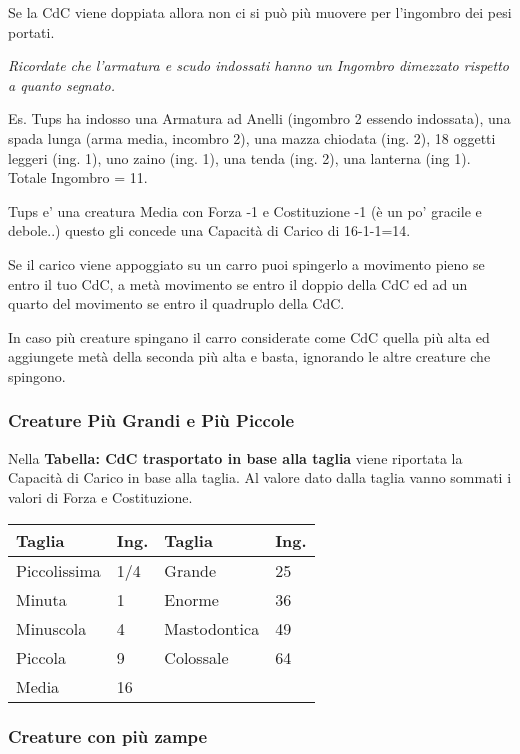 \documentclass[12pt,a4paper,twoside,openany]{book}
\begin{document}
\begin{multicols}{2}
Se la CdC viene doppiata allora non ci si può più muovere per l'ingombro dei pesi portati.

\textit{Ricordate che l'armatura e scudo indossati hanno un Ingombro dimezzato rispetto a quanto segnato.}

Es. Tups ha indosso una Armatura ad Anelli (ingombro 2 essendo indossata), una spada lunga (arma media, incombro 2), una mazza chiodata (ing. 2), 18 oggetti leggeri (ing. 1), uno zaino (ing. 1), una tenda (ing. 2), una lanterna (ing 1). Totale Ingombro = 11.

Tups e' una creatura Media con Forza -1 e Costituzione -1 (è un po' gracile e debole..) questo gli concede una Capacità di Carico di 16-1-1=14.

Se il carico viene appoggiato su un carro puoi spingerlo a movimento pieno se entro il tuo CdC, a metà movimento se entro il doppio della CdC ed ad un quarto del movimento se entro il quadruplo della CdC.

In caso più creature spingano il carro considerate come CdC quella più alta ed aggiungete metà della seconda più alta e basta, ignorando le altre creature che spingono.

\subsubsection{Creature Più Grandi e Più Piccole}

Nella \textbf{Tabella: CdC trasportato in base alla taglia} viene riportata la Capacità di Carico in base alla taglia. Al valore dato dalla taglia vanno sommati i valori di Forza e Costituzione.

\medskip

\begin{tabularx}{0.45\textwidth}{ll|ll}
\textbf{Taglia}& \textbf{Ing.}&\textbf{Taglia} & \textbf{Ing.}\\
\toprule
Piccolissima &1/4& Grande & 25\\
Minuta & 1 & Enorme& 36\\
Minuscola & 4& Mastodontica&49\\
Piccola & 9 & Colossale&64\\
Media & 16&&\\
\end{tabularx}

\medskip

\subsubsection{Creature con più zampe}


\end{multicols}
\end{document}
